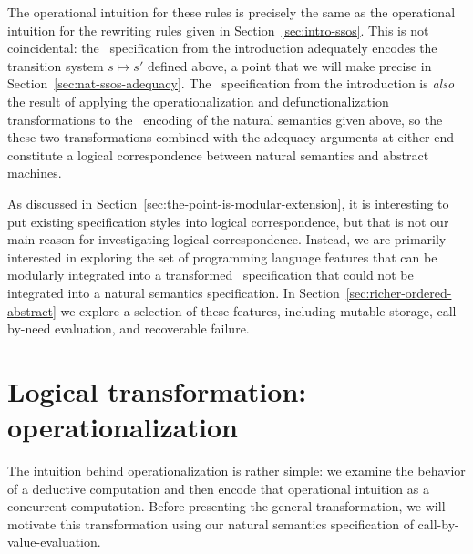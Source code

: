 The operational intuition for these rules is precisely the same as the
operational intuition for the rewriting rules given in
Section~\ref{sec:intro-ssos}. This is not coincidental: the
\sls~specification from the introduction adequately encodes the
transition system $s \mapsto s'$ defined above, a point that we will
make precise in Section~\ref{sec:nat-ssos-adequacy}. The
\sls~specification from the introduction is {\it also} the result of
applying the operationalization and defunctionalization
transformations to the \sls~encoding of the natural semantics given
above, so the these two transformations combined with the adequacy
arguments at either end constitute a logical correspondence between
natural semantics and abstract machines. 

As discussed in Section~\ref{sec:the-point-is-modular-extension}, it
is interesting to put existing specification styles into logical
correspondence, but that is not our main reason for investigating
logical correspondence. Instead, we are primarily interested in
exploring the set of programming language features that can be
modularly integrated into a transformed \sls~specification that could
not be integrated into a natural semantics specification.  In
Section~\ref{sec:richer-ordered-abstract} we explore a selection of
these features, including mutable storage, call-by-need evaluation,
and recoverable failure.

\section{Logical transformation: operationalization}
\label{sec:operationalization}

The intuition behind operationalization is rather simple: we examine
the behavior of a deductive computation and then encode that
operational intuition as a concurrent computation.  Before presenting
the general transformation, we will motivate this transformation using
our natural semantics specification of call-by-value-evaluation. 

